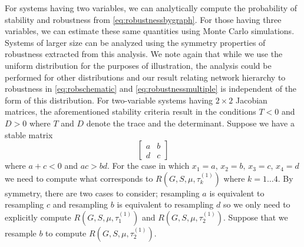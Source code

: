 For systems having two variables, we can analytically compute the probability of stability and robustness from \ref{eq:robustnessbygraph}. For those having three variables, we can estimate these same quantities using Monte Carlo simulations. Systems of larger size can be analyzed using the symmetry properties of robustness extracted from this analysis. We note again that while we use the uniform distribution for the purposes of illustration, the analysis could be performed for other distributions and our result relating network hierarchy to robustness in \ref{eq:robschematic} and \ref{eq:robustnessmultiple} is independent of the form of this distribution. For two-variable systems having $2 \times 2$ Jacobian matrices, the aforementioned stability criteria result in the conditions $T < 0$ and $D >
0$ where $T$ and $D$ denote the trace and the determinant. Suppose we have a stable matrix
$$
\begin{bmatrix}
a & b \\
d & c
\end{bmatrix}
$$
where $a + c < 0$ and $ac > bd$.  For the case in which $x_1=a,\,x_2=b,\,x_3=c,\,x_4=d$ we need to compute what corresponds to $R(G,S,\mu,\tau^{(1)}_k)$ where $k=1 \ldots 4$. By symmetry, there are two cases to consider; resampling $a$ is equivalent to resampling $c$ and resampling $b$ is equivalent to resampling $d$ so we only need to explicitly compute $R(G,S,\mu,\tau^{(1)}_1)$ and $R(G,S,\mu,\tau^{(1)}_2)$. Suppose that we resample $b$ to compute $R(G,S,\mu,\tau^{(1)}_2)$.
